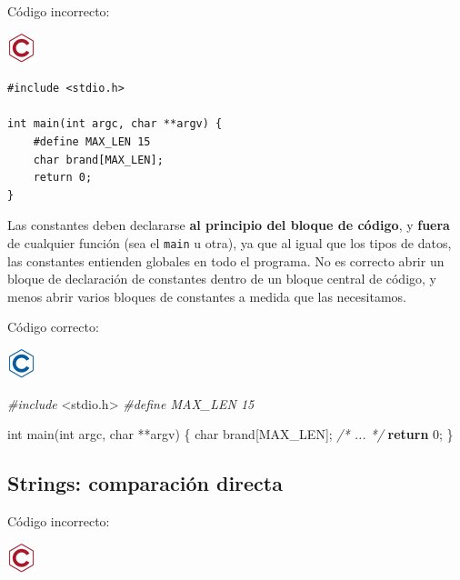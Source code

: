 \documentclass[
]{book}
\newenvironment{Shaded}{\begin{snugshade}}{\end{snugshade}}
\newcommand{\CommentTok}[1]{\textcolor[rgb]{0.56,0.35,0.01}{\textit{#1}}}
\newcommand{\ControlFlowTok}[1]{\textcolor[rgb]{0.13,0.29,0.53}{\textbf{#1}}}
\newcommand{\DataTypeTok}[1]{\textcolor[rgb]{0.13,0.29,0.53}{#1}}
\newcommand{\DecValTok}[1]{\textcolor[rgb]{0.00,0.00,0.81}{#1}}
\newcommand{\ImportTok}[1]{#1}
\newcommand{\NormalTok}[1]{#1}
\newcommand{\PreprocessorTok}[1]{\textcolor[rgb]{0.56,0.35,0.01}{\textit{#1}}}
\begin{document}
Código incorrecto:

\includegraphics{./img/c_err.png}

\begin{verbatim}
#include <stdio.h>

int main(int argc, char **argv) {
    #define MAX_LEN 15
    char brand[MAX_LEN];
    return 0;
}
\end{verbatim}

Las constantes deben declararse \textbf{al principio del bloque de código}, y \textbf{fuera} de cualquier función (sea el \texttt{main} u otra), ya que al igual que los tipos de datos, las constantes entienden globales en todo el programa. No es correcto abrir un bloque de declaración de constantes dentro de un bloque central de código, y menos abrir varios bloques de constantes a medida que las necesitamos.

Código correcto:

\includegraphics{./img/c.png}

\begin{Shaded}
\begin{Highlighting}[]
\PreprocessorTok{\#include }\ImportTok{\textless{}stdio.h\textgreater{}}
\PreprocessorTok{\#define MAX\_LEN 15}

\DataTypeTok{int}\NormalTok{ main(}\DataTypeTok{int}\NormalTok{ argc, }\DataTypeTok{char}\NormalTok{ **argv) \{}
    \DataTypeTok{char}\NormalTok{ brand[MAX\_LEN];}
    \CommentTok{/* ... */}
    \ControlFlowTok{return} \DecValTok{0}\NormalTok{;}
\NormalTok{\}}
\end{Highlighting}
\end{Shaded}

\hypertarget{strings-comparaciuxf3n-directa}{%
\subsection{Strings: comparación directa}\label{strings-comparaciuxf3n-directa}}

Código incorrecto:

\includegraphics{./img/c_err.png}
\end{document}
